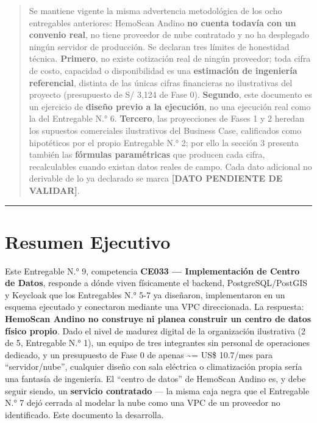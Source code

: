 \documentclass[11pt,a4paper]{article}
\begin{document}
\begin{quote}
Se mantiene vigente la misma advertencia metodológica de los ocho entregables anteriores: HemoScan Andino \textbf{no cuenta todavía con un convenio real}, no tiene proveedor de nube contratado y no ha desplegado ningún servidor de producción. Se declaran tres límites de honestidad técnica. \textbf{Primero}, no existe cotización real de ningún proveedor; toda cifra de costo, capacidad o disponibilidad es una \textbf{estimación de ingeniería referencial}, distinta de las únicas cifras financieras no ilustrativas del proyecto (presupuesto de S/ 3,124 de Fase 0). \textbf{Segundo}, este documento es un ejercicio de \textbf{diseño previo a la ejecución}, no una ejecución real como la del Entregable N.° 6. \textbf{Tercero}, las proyecciones de Fases 1 y 2 heredan los supuestos comerciales ilustrativos del Business Case, calificados como hipotéticos por el propio Entregable N.° 2; por ello la sección 3 presenta también las \textbf{fórmulas paramétricas} que producen cada cifra, recalculables cuando existan datos reales de campo. Cada dato adicional no derivable de lo ya declarado se marca \textbf{{[}DATO PENDIENTE DE VALIDAR{]}}.
\end{quote}

\begin{center}\rule{0.5\linewidth}{0.5pt}\end{center}

\section{Resumen Ejecutivo}\label{resumen-ejecutivo}

Este Entregable N.° 9, competencia \textbf{CE033 --- Implementación de Centro de Datos}, responde a dónde viven físicamente el backend, PostgreSQL/PostGIS y Keycloak que los Entregables N.° 5-7 ya diseñaron, implementaron en un esquema ejecutado y conectaron mediante una VPC direccionada. La respuesta: \textbf{HemoScan Andino no construye ni planea construir un centro de datos físico propio}. Dado el nivel de madurez digital de la organización ilustrativa (2 de 5, Entregable N.° 1), un equipo de tres integrantes sin personal de operaciones dedicado, y un presupuesto de Fase 0 de apenas \textasciitilde= US\$ 10.7/mes para ``servidor/nube'', cualquier diseño con sala eléctrica o climatización propia sería una fantasía de ingeniería. El ``centro de datos'' de HemoScan Andino es, y debe seguir siendo, un \textbf{servicio contratado} --- la misma caja negra que el Entregable N.° 7 dejó cerrada al modelar la nube como una VPC de un proveedor no identificado. Este documento la desarrolla.
\end{document}
